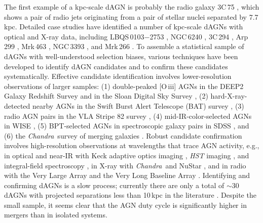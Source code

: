 \documentclass[iop,revtex4,twocolumn,apj,numberedappendix,appendixfloats]{emulateapj}
\newcommand{\chandra}{{\it Chandra}}
\begin{document}
The first example of a kpc-scale dAGN is probably the radio galaxy 3C\,75 \citep{Owen85}, which shows a pair of radio jets originating from a pair of stellar nuclei separated by 7.7\,kpc. Detailed case studies have identified a number of kpc-scale dAGNs with optical and X-ray data, including LBQS\,0103$-$2753 \citep{Junkkarinen01}, NGC\,6240 \citep{Komossa03}, 3C\,294 \citep{Stockton04}, Arp\,299 \citep{Ballo04}, Mrk\,463 \citep{Bianchi08}, NGC\,3393 \citep{Fabbiano11}, and Mrk\,266 \citep{Mazzarella12}.
%
To assemble a statistical sample of dAGNs with well-understood selection biases, various techniques have been developed to identify dAGN candidates and to confirm these candidates systematically. 
%
Effective candidate identification involves lower-resolution observations of larger samples: (1) double-peaked [O\,{\sc iii}] AGNs in the DEEP2 Galaxy Redshift Survey \citep{Gerke07,Comerford09a} and in the Sloan Digital Sky Survey \citep[SDSS;][]{Wang09,Liu10a,Smith10}, (2) hard-X-ray-detected nearby AGNs in the Swift Burst Alert Telescope (BAT) survey \citep{Koss10}, (3) radio AGN pairs in the VLA Stripe 82 survey \citep{Fu15a}, (4) mid-IR-color-selected AGNs in WISE \citep{Satyapal14,Satyapal17}, (5) BPT-selected AGNs in spectroscopic galaxy pairs in SDSS \citep{Ellison11,Liu12,Fu18}, and (6) the \chandra \ survey of merging galaxies \citep{Brassington07,Teng12}.
%
Robust candidate confirmation involves high-resolution observations at wavelengths that trace AGN activity, e.g., in optical and near-IR with Keck adaptive optics imaging \citep{Fu11a,Rosario11}, \textit{HST} imaging \citep{Liu13,Comerford15,Liu17c}, and integral-field spectroscopy \citep{McGurk11,Fu12a}, in X-ray with \chandra \,\citep{Comerford11,Koss11,Koss12,Teng12,Liu13a,Comerford15,Ellison17} and NuStar \citep{Ptak15,Koss16}, and in radio with the Very Large Array \citep{Fu11b,Fu15b,Muller-Sanchez15} and the Very Long Baseline Array \citep{Tingay11,Deane14,Wrobel14,Bondi16,Liu17b}.
%
Identifying and confirming dAGNs is a slow process; currently there are only a total of $\sim$30 dAGNs with projected separations less than 10\,kpc in the literature \citep[see][for a compilation]{Satyapal17}. Despite the small sample, it seems clear that the AGN duty cycle is significantly higher in mergers than in isolated systems. 
\end{document}
